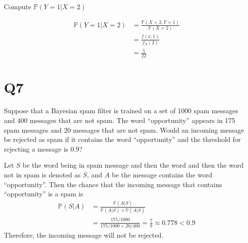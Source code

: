 \documentclass[11pt]{article}
\begin{document}
\begin{qparts}
    \item Compute $\mathbb{P}(Y=1\vert X=2)$
    \begin{solution}
        \begin{align*}
            \mathbb{P}(Y=1\vert X=2)&=\frac{\mathbb{P}(X=2,Y=1)}{\mathbb{P}(X=2)}\\
            &=\frac{f(x,1)}{f_{X}(2)}\\
            &=\frac{5}{22}
        \end{align*}
    \end{solution}
\end{qparts}


\section*{Q7}
Suppose that a Bayesian spam filter is trained on a set of 1000
spam messages and 400 messages that are not spam. The
word “opportunity” appears in 175 spam messages and 20
messages that are not spam. Would an incoming message be
rejected as spam if it contains the word “opportunity” and the
threshold for rejecting a message is 0.9?
\begin{solution}
    Let $S$ be the word being in spam message and then the word 
    and then the word not in spam is denoted as $\overline{S}$, and $A$ be the message contains the word ``opportunity''. Then the chance that the incoming message that contains ``opportunity'' is a spam is
    \begin{align*}
        \mathbb{P}(S \vert A)&=\frac{\mathbb{P}(A\vert S)}{\mathbb{P}(A\vert S)+\mathbb{P}(A\vert \overline{S})}\\
        &=\frac{175 / 1000}{175 / 1000 + 20 / 400}=\frac{7}{9}\approx  0.778<0.9
    \end{align*}
    Therefore, the incoming message will not be rejected.
\end{solution}
\end{document}
